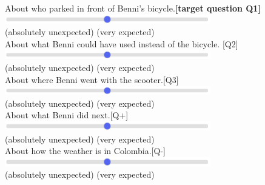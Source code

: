 \documentclass{salt}
\begin{document}
\begin{figure}[]
About who parked in front of Benni's bicycle.\hfill \textbf{[target question Q1]}\\
\includegraphics[width=0.8\textwidth]{slider.png}\vspace{-2ex}\\
\footnotesize(absolutely unexpected) \hspace{34ex} (very expected)\\
About what Benni could have used instead of the bicycle. \hfill [Q2]\\
\includegraphics[width=0.8\textwidth]{slider.png}\vspace{-2ex}\\
\footnotesize(absolutely unexpected) \hspace{34ex} (very expected)\\
About where Benni went with the scooter.\hfill [Q3]\\
\includegraphics[width=0.8\textwidth]{slider.png}\vspace{-2ex}\\
\footnotesize(absolutely unexpected) \hspace{34ex} (very expected)\\
About what Benni did next.\hfill [Q+]\\
\includegraphics[width=0.8\textwidth]{slider.png}\vspace{-2ex}\\
\footnotesize(absolutely unexpected) \hspace{34ex} (very expected)\\
About how the weather is in Colombia.\hfill [Q-]\\
\includegraphics[width=0.8\textwidth]{slider.png}\vspace{-2ex}\\
\footnotesize(absolutely unexpected) \hspace{34ex} (very expected)\\\normalsize
\label{fig:stimulus_exp1}
\end{figure}
\end{document}
